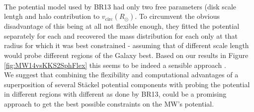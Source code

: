 \\The potential model used by BR13 had only two free parameters (disk scale lentgh and halo contribution to $v_\text{circ}(R_\odot)$. To circumvent the obvious disadvantage of this being at all not flexible enough, they fitted the potential separately for each \MAP{} and recovered the mass distribution for each \MAP{} only at that radius for which it was best constrained - assuming that \MAPs{} of different scale length would probe different regions of the Galaxy best. Based on our results in Figure \ref{fig:MW14vsKKS2SphFlex} this seems to be indeed a sensible approach .
\\We suggest that combining the flexibility and computational advantages of a superposition of several St\"{a}ckel potential components with probing the potential in different regions with different \MAPs{} as done by BR13, could be a promising approach to get the best possible constraints on the MW's potential.\\


